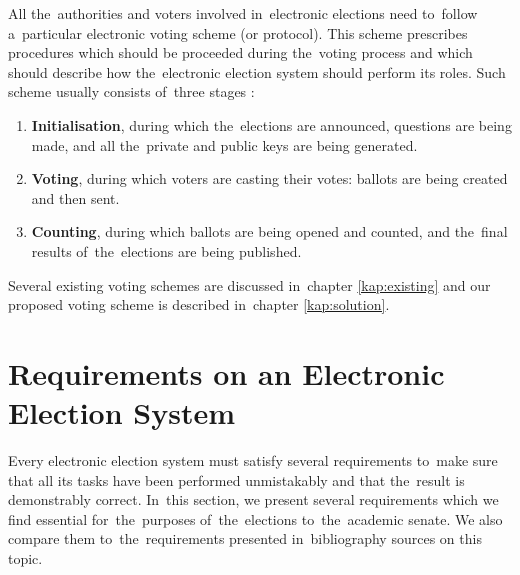 All the~authorities and voters involved in~electronic elections need to~follow a~particular electronic voting scheme (or protocol). This scheme prescribes procedures which should be proceeded during the~voting process and which should describe how the~electronic election system should perform its roles. 
Such scheme usually consists of~three stages \cite{Rjaskova}:
\begin{enumerate}
\item \textbf{Initialisation}, during which the~elections are announced, questions are being made, and all the~private and public keys are being generated. 
\item \textbf{Voting}, during which voters are casting their votes: ballots are being created and then sent.
\item \textbf{Counting}, during which ballots are being opened and counted, and the~final results of~the~elections are being published.
\end{enumerate}

Several existing voting schemes are discussed in~chapter \ref{kap:existing} and our proposed voting scheme is described in~chapter \ref{kap:solution}.

\section{Requirements on an Electronic Election System}

\label{sec:requirements}

Every electronic election system must satisfy several requirements to~make sure that all its tasks have been performed unmistakably and that the~result is demonstrably correct. In~this section, we present several requirements which we find essential for~the~purposes of~the~elections to~the~academic senate. We also compare them to~the~requirements presented in~bibliography sources on this topic. %

